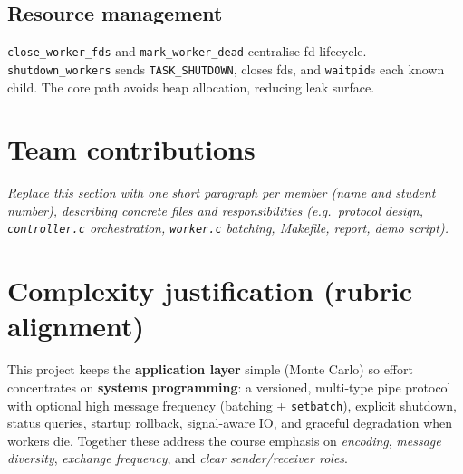 \documentclass[11pt]{article}
\begin{document}
\subsection{Resource management}
\texttt{close\_worker\_fds} and \texttt{mark\_worker\_dead} centralise fd lifecycle. \texttt{shutdown\_workers} sends \texttt{TASK\_SHUTDOWN}, closes fds, and \texttt{waitpid}s each known child. The core path avoids heap allocation, reducing leak surface.

\section{Team contributions}
\label{sec:contributions}

\textit{Replace this section with one short paragraph per member (name and student number), describing concrete files and responsibilities (e.g.\ protocol design, \texttt{controller.c} orchestration, \texttt{worker.c} batching, Makefile, report, demo script).}

\section*{Complexity justification (rubric alignment)}
This project keeps the \textbf{application layer} simple (Monte Carlo) so effort concentrates on \textbf{systems programming}: a versioned, multi-type pipe protocol with optional high message frequency (batching + \texttt{setbatch}), explicit shutdown, status queries, startup rollback, signal-aware IO, and graceful degradation when workers die. Together these address the course emphasis on \emph{encoding}, \emph{message diversity}, \emph{exchange frequency}, and \emph{clear sender/receiver roles}.
\end{document}
